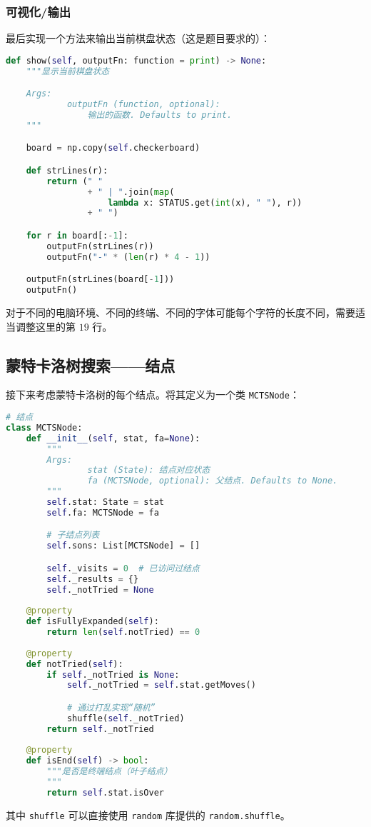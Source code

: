 \subsubsection{可视化/输出}
最后实现一个方法来输出当前棋盘状态（这是题目要求的）：
\begin{lstlisting}[language=python]
def show(self, outputFn: function = print) -> None:
    """显示当前棋盘状态

    Args:
            outputFn (function, optional):
                输出的函数. Defaults to print.
    """

    board = np.copy(self.checkerboard)

    def strLines(r):
        return (" "
                + " | ".join(map(
                    lambda x: STATUS.get(int(x), " "), r))
                + " ")

    for r in board[:-1]:
        outputFn(strLines(r))
        outputFn("-" * (len(r) * 4 - 1))

    outputFn(strLines(board[-1]))
    outputFn()
\end{lstlisting}
对于不同的电脑环境、不同的终端、不同的字体可能每个字符的长度不同，需要适当调整这里的第 $19$ 行。

\subsection{蒙特卡洛树搜索——结点}
接下来考虑蒙特卡洛树的每个结点。将其定义为一个类 \verb`MCTSNode`：
\begin{lstlisting}[language=python]
# 结点
class MCTSNode:
    def __init__(self, stat, fa=None):
        """
        Args:
                stat (State): 结点对应状态
                fa (MCTSNode, optional): 父结点. Defaults to None.
        """
        self.stat: State = stat
        self.fa: MCTSNode = fa

        # 子结点列表
        self.sons: List[MCTSNode] = []

        self._visits = 0  # 已访问过结点
        self._results = {}
        self._notTried = None
    
    @property
    def isFullyExpanded(self):
        return len(self.notTried) == 0
            
    @property
    def notTried(self):
        if self._notTried is None:
            self._notTried = self.stat.getMoves()

            # 通过打乱实现“随机”
            shuffle(self._notTried)
        return self._notTried
    
    @property
    def isEnd(self) -> bool:
        """是否是终端结点（叶子结点）
        """
        return self.stat.isOver
\end{lstlisting}
其中 \verb`shuffle` 可以直接使用 \verb`random` 库提供的 \verb`random.shuffle`。


